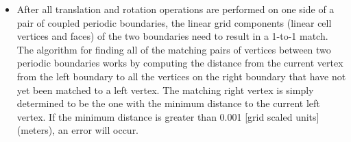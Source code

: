 

\begin{itemize}
  \item
    After all translation and rotation operations are performed on one side of a
    pair of coupled periodic boundaries, the linear grid components (linear cell
    vertices and faces) of the two boundaries need to result in a 1-to-1 match.
    The algorithm for finding all of the matching pairs of vertices between two
    periodic boundaries works by computing the distance from the current vertex
    from the left boundary to all the vertices on the right boundary that have
    not yet been matched to a left vertex.
    The matching right vertex is simply determined to be the one with the
    minimum distance to the current left vertex.
    If the minimum distance is greater than 0.001
    [grid scaled units]
    (\thatis meters), an error will occur.


\end{itemize}
